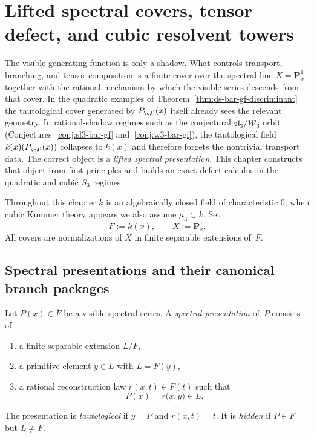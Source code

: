 \chapter{Lifted spectral covers, tensor defect, and cubic resolvent towers}
\label{ch:lifted-spectral-defect}

The visible generating function is only a shadow.  What controls transport,
branching, and tensor composition is a finite cover over the spectral line
$X=\mathbf P^1_x$ together with the rational mechanism by which the visible
series descends from that cover.  In the quadratic examples of
Theorem~\ref{thm:ds-bar-gf-discriminant} the tautological cover generated by
$P_{\cA^!}(x)$ itself already sees the relevant geometry.  In rational-shadow
regimes such as the conjectural
$\widehat{\mathfrak{sl}}_3/\mathcal W_3$ orbit
(Conjectures~\ref{conj:sl3-bar-gf} and~\ref{conj:w3-bar-gf}), the tautological
field $k(x)(P_{\cA^!}(x))$ collapses to $k(x)$ and therefore forgets the
nontrivial transport data.  The correct object is a \emph{lifted spectral
presentation}.  This chapter constructs that object from first principles and
builds an exact defect calculus in the quadratic and cubic $S_3$ regimes.

Throughout this chapter $k$ is an algebraically closed field of
characteristic $0$; when cubic Kummer theory appears we also assume
$\mu_3\subset k$.  Set
\[
F:=k(x), \qquad X:=\mathbf P^1_x.
\]
All covers are normalizations of $X$ in finite separable extensions of~$F$.

\section{Spectral presentations and their canonical branch packages}
\label{sec:spectral-presentations}

\begin{definition}
\label{def:spectral-presentation}
Let $P(x)\in \overline{F}$ be a visible spectral series.
A \emph{spectral presentation} of~$P$ consists of
\begin{enumerate}[label=\textup{(\roman*)}]
\item a finite separable extension $L/F$,
\item a primitive element $y\in L$ with $L=F(y)$,
\item a rational reconstruction law $r(x,t)\in F(t)$ such that
\[
P(x)=r\bigl(x,y\bigr)\in L.
\]
\end{enumerate}
The presentation is \emph{tautological} if $y=P$ and $r(x,t)=t$.
It is \emph{hidden} if $P\in F$ but $L\neq F$.
\end{definition}

